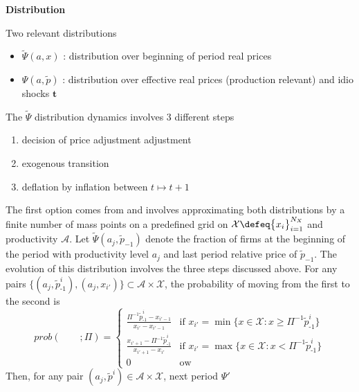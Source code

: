 \documentclass[a4paper,10pt]{article}  %
\begin{document}
\textbf{Distribution}

Two relevant distributions
\begin{itemize}[label=\raisebox{0.25ex}{\tiny $\bullet$ }]
   
   \item $ \widetilde{\Psi}(a,x) $ : distribution over beginning of period real prices
   \item $ \Psi(a, \tilde{p}) $ : distribution over effective real prices (production relevant) and idio shocks $
   \mathbf{t} $
\end{itemize}
The $\widetilde{\Psi}$ distribution dynamics involves 3 different steps
\begin{enumerate}
   \item decision of price adjustment adjustment 
   \item exogenous transition
   \item deflation by inflation between $ t\mapsto t+1 $
\end{enumerate}
The first option comes from \citet{reiter} and involves approximating both distributions by a finite number of mass
points on a predefined grid on $ \mathcal{X} \defeq \big\{ x_i \big\}_{i=1}^{N_X} $ and productivity $\mathcal{A}$.
Let $ \widetilde{\Psi}( a_j, \tilde{p}_{-1} ) $ denote the fraction of firms at the beginning of the period with
productivity level $ a_j $ and last period relative price of $ \tilde{p}_{-1}$. The evolution of this distribution
involves the three steps discussed above. For any pairs $\Big\{ ( a_{j}, \tilde{p}_{\text{-} 1}^i ) , ( a_{j}, x_{i'}
)\Big\}  \subset \mathcal{A}\times \mathcal{X} $, the probability of moving from the first to the second is
\begin{equation}
   \label{eq:transition_inflation}
   prob( \qquad ; \Pi) = 
   \begin{cases}
      \frac{ \Pi^{-1} \tilde{p}_{\text{-} 1}^i - x_{i'-1} }{ x_{i'} - x_{i'-1}}   & \text{if } x_{i'}=\min \big\{ x \in
      \mathcal{X} : x \ge \Pi^{-1} \tilde{p}_{\text{-} 1}^i \big\} \\
      \frac{ x_{i'+1} - \Pi^{-1} \tilde{p}_{\text{-} 1}^i }{ x_{i'+1} - x_{i'}}   & \text{if } x_{i'}=\max \big\{ x \in
      \mathcal{X} : x < \Pi^{-1} \tilde{p}_{\text{-} 1}^i \big\}   \\ 0 & \text{ow}
   \end{cases}
\end{equation}
Then, for any pair $ ( a_{j}, \tilde{p}^i ) \in \mathcal{A}\times \mathcal{X} $, next period ${\Psi}'$
\end{document}
